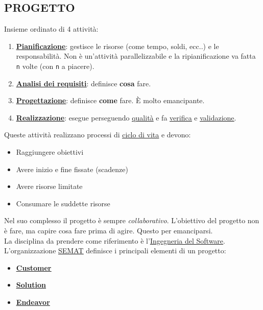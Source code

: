 		\subsection{PROGETTO}  \label{progetto}
		Insieme ordinato di 4 attività:
			\begin{enumerate}
				\item \underline{\hyperref[pianificazione]{\textbf{Pianificazione}}}: gestisce le risorse (come tempo, soldi, ecc..) e le responsabilità. Non è un'attività parallelizzabile e la ripianificazione va fatta \texttt{n} volte (con \texttt{n} a piacere).
				\item \underline{\hyperref[analisideirequisiti]{\textbf{Analisi dei requisiti}}}: definisce \textbf{cosa} fare.
				\item \underline{\hyperref[progettazione]{\textbf{Progettazione}}}: definisce \textbf{come} fare. È molto emancipante.
				\item \underline{\hyperref[realizzazione]{\textbf{Realizzazione}}}: esegue perseguendo \underline{\hyperref[qualita]{qualità}} e fa \underline{\hyperref[verificare]{verifica}} e \underline{\hyperref[validare]{validazione}}.
			\end{enumerate}
		Queste attività realizzano processi di \underline{\hyperref[ciclo]{ciclo di vita}} e devono:
			\begin {itemize}
				\item Raggiungere obiettivi
				\item Avere inizio e fine fissate (scadenze)
				\item Avere risorse limitate
				\item Consumare le suddette risorse
			\end {itemize}
		Nel suo complesso il progetto è sempre \textit{collaborativo}.
		L'obiettivo del progetto non è fare, ma capire cosa fare prima di agire. Questo per emanciparsi. \\
		La disciplina da prendere come riferimento è l'\underline{\hyperref[swe]{Ingegneria del Software}}.\\
		L'organizzazione \underline{\hyperref[semat]{SEMAT}} definisce i principali elementi di un progetto:
			\begin{itemize}
				\item \textbf{\underline{\hyperref[customer]{Customer}}}
				\item \textbf{\underline{\hyperref[solution]{Solution}}}
				\item \textbf{\underline{\hyperref[endeavor]{Endeavor}}}
			\end{itemize}

